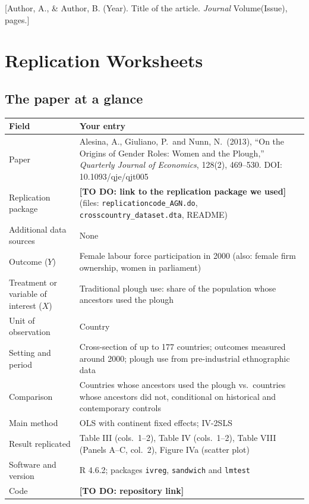 \documentclass[12pt,a4paper]{article}
\renewcommand{\arraystretch}{1.25}
\begin{document}
\begin{thebibliography}{0}
 [Author, A., \& Author, B. (Year). Title of the article.
\textit{Journal} Volume(Issue), pages.]
\end{thebibliography}

\clearpage
\appendix
\section{Replication Worksheets}
\subsection{The paper at a glance}

{\renewcommand{\arraystretch}{1.4}%
\begin{tabularx}{\textwidth}{@{}>{\raggedright\arraybackslash}p{}L@{}}
\toprule
Field & Your entry \\
\midrule
Paper & Alesina, A., Giuliano, P.\ and Nunn, N.\ (2013), ``On the Origins of Gender Roles: Women and the Plough,'' \textit{Quarterly Journal of Economics}, 128(2), 469--530. DOI: 10.1093/qje/qjt005 \\
Replication package & \textbf{[TO DO: link to the replication package we used]} (files: \texttt{replicationcode\_AGN.do}, \texttt{crosscountry\_dataset.dta}, README) \\
Additional data sources & None \\
Outcome ($Y$) & Female labour force participation in 2000 (also: female firm ownership, women in parliament) \\
Treatment or variable of interest ($X$) & Traditional plough use: share of the population whose ancestors used the plough \\
Unit of observation & Country \\
Setting and period & Cross-section of up to 177 countries; outcomes measured around 2000; plough use from pre-industrial ethnographic data \\
Comparison & Countries whose ancestors used the plough vs.\ countries whose ancestors did not, conditional on historical and contemporary controls \\
Main method & OLS with continent fixed effects; IV-2SLS \\
Result replicated & Table III (cols.\ 1--2), Table IV (cols.\ 1--2), Table VIII (Panels A--C, col.\ 2), Figure IVa (scatter plot) \\
Software and version & R 4.6.2; packages \texttt{ivreg}, \texttt{sandwich} and \texttt{lmtest} \\
Code & \textbf{[TO DO: repository link]} \\
\bottomrule
\end{tabularx}}
\end{document}

